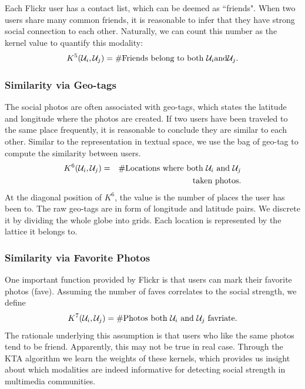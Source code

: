 Each Flickr user has a contact list, which can be deemed as ``friends". When two users share many common friends, it is reasonable to infer that they have strong
social connection to each other. Naturally, we can count this number as the kernel value to quantify this modality:
\[
K^5({\cal U}_i, {\cal U}_j) =  \#\mbox{Friends belong to both }{\cal U}_i \mbox{and} {\cal U}_j.
\]

\subsubsection{Similarity via Geo-tags}

The social photos are often associated with geo-tags, which states the latitude and longitude where the photos are created. If two users have been traveled to
the same place frequently, it is reasonable to conclude they are similar to each other. Similar to the representation in textual space, we use the bag of
geo-tag to compute the similarity between users.
\begin{eqnarray}
K^6({\cal U}_i, {\cal U}_j) &=& \#\mbox{Locations where both } {\cal U}_i \mbox{ and } {\cal U}_j \nonumber\\
&& \mbox{taken photos}. \nonumber
\end{eqnarray}
At the diagonal position of $K^6$, the value is the number of places the user has been to. The raw geo-tags are in form of longitude and latitude pairs. We
discrete it by dividing the whole globe into grids. Each location is represented by the lattice it belongs to.

\subsubsection{Similarity via Favorite Photos}

One important function provided by Flickr is that users can mark their favorite photos (fave). Assuming the number of faves correlates to the social strength,
we define
\[
K^7({\cal U}_i, {\cal U}_j) = \#\mbox{Photos both }{\cal U}_i \mbox{ and }{\cal U}_j \mbox{ favriate}.
\]
The rationale underlying this assumption is that users who like the same photos tend to be friend. Apparently, this may not be true in real case. Through the
KTA algorithm we learn the weights of these kernels, which provides us insight about which modalities are indeed informative for detecting social strength in multimedia communities.

